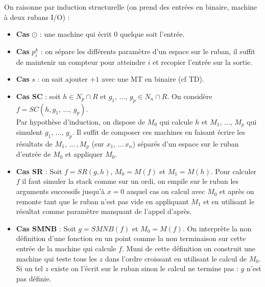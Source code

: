 \documentclass[12pt,letterpaper,boxed]{hmcpset}
\begin{document}
\begin{solution}
On raisonne par induction structurelle (on prend des entrées en binaire, machine à deux rubans I/O) :
\begin{itemize}
\item \textbf{Cas} $\odot$ : une machine qui écrit 0 quelque soit l'entrée.
\item \textbf{Cas} $p^{k}_{i}$ : on sépare les différents paramètre d'un espace sur le ruban, il suffit de maintenir un compteur pour atteindre $i$ et recopier l'entrée sur la sortie.
\item \textbf{Cas} $s$ : on sait ajouter $+1$ avec une MT en binaire (cf TD).

\item \textbf{Cas SC} : soit $h \in N_{p} \cap R$ et $g_{1}, \, \dots , \, g_{p} \in N_{n} \cap R$. On   
considère $f = SC(h,g_{1}, \, \dots , \, g_{p})$. \\
Par hypothèse d'induction, on dispose de $M_{0}$ qui calcule $h$ et $M_{1} , \, \dots , \, M_{p}$ qui simulent  $g_{1}, \, \dots , \, g_{p}$. Il suffit de composer ces machines en faisant écrire les résultats de $M_{1} , \, \dots \, , M_{p}$ (sur $x_{1} , \, \dots \, x_{n}$) séparés d'un espace sur le ruban d'entrée de $M_{0}$ et appliquer $M_{0}$.

\item \textbf{Cas SR} : Soit $f = SR(g,h)$, $M_{0} = M(f)$ et $M_{1} = M(h)$. Pour calculer $f$ il faut simuler la stack comme sur un ordi, on empile sur le ruban les arguments successifs jusqu'à $x = 0$ auquel cas on calcul avec $M_{0}$ et après on remonte tant que le ruban n'est pas vide en appliquant $M_{1}$ et en utilisant le résultat comme paramètre manquant de l'appel d'après.

\item \textbf{Cas SMNB} : Soit $g = SMNB(f)$ et $M_{0} = M(f)$. On interprète la non définition d'une fonction en un point comme la non terminaison sur cette entrée de la machine qui calcule $f$. Muni de cette définition on construit une machine qui teste tous les $z$ dans l'ordre croissant en utilisant le calcul de $M_{0}$. Si un tel $z$ existe on l'écrit sur le ruban sinon le calcul ne termine pas : $g$ n'est pas définie.
\end{itemize}


\end{solution}
\end{document}
